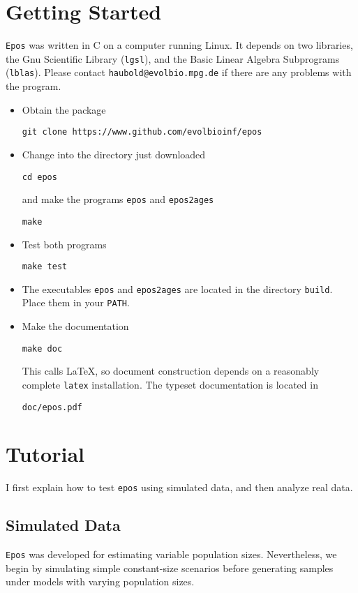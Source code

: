 \documentclass[a4paper, english]{article}
\newcommand{\bi}{\begin{itemize}}
\newcommand{\ei}{\end{itemize}}
\newcommand{\I}{\item}
\newcommand{\ty}{\texttt}
\begin{document}
\section{Getting Started}
\ty{Epos} was written in C on a computer running Linux. It depends on
two libraries, the Gnu Scientific Library
(\ty{lgsl}), and the Basic Linear Algebra Subprograms (\ty{lblas}). 
Please contact \ty{haubold@evolbio.mpg.de} if there are any problems with the program.
\bi
\I Obtain the package
\begin{verbatim}
git clone https://www.github.com/evolbioinf/epos
\end{verbatim}
\I Change into the directory just downloaded
\begin{verbatim}
cd epos
\end{verbatim}
and make the programs \ty{epos} and \ty{epos2ages}
\begin{verbatim}
make
\end{verbatim}
\I Test both programs
\begin{verbatim}
make test
\end{verbatim}
\I The executables \ty{epos} and \ty{epos2ages} are located in the
directory \ty{build}. Place them in your \ty{PATH}.
\I  Make the documentation
\begin{verbatim}
make doc
\end{verbatim}
This calls \LaTeX{}, so document construction depends on a reasonably
complete \ty{latex} installation. The typeset documentation is located
in
\begin{verbatim}
doc/epos.pdf
\end{verbatim}
\ei

\section{Tutorial}\label{sec:tut}
I first explain how to test \ty{epos} using simulated data, and then
analyze real data.
\subsection{Simulated Data}
\ty{Epos} was developed for estimating variable population
sizes. Nevertheless, we begin by simulating simple constant-size
scenarios before generating samples under models with varying population
sizes.
\end{document}
